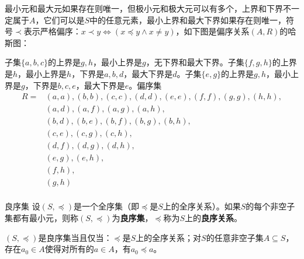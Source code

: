 \documentclass[lang=cn,11pt]{elegantbook}
\begin{document}
最小元和最大元如果存在则唯一，但极小元和极大元可以有多个，上界和下界不一定属于$A$，它们可以是$S$中的任意元素，最小上界和最大下界如果存在则唯一，符号$\prec$表示严格偏序：$x \prec y \Leftrightarrow (x \preccurlyeq y \land x \neq y)$，如下图是偏序关系$(A,R)$的哈斯图：
\begin{figure}[!ht]
\centering
{}%
\end{figure}
子集$\{a,b,c\}$的上界是$g,h$，最小上界是$g$，无下界和最大下界。子集$\{f,g,h\}$的上界是$h$，最小上界是$h$，下界是$a,b,d$，最大下界是$d$。子集$\{e,g\}$的上界是$g,h$，最小上界是$g$，下界是$b,c,e$，最大下界是$e$。偏序集
\begin{align*}
R = &(a,a), (b,b), (c,c), (d,d), (e,e), (f,f), (g,g), (h,h),\\
&(a,d), (a,f), (a,g), (a,h),\\
&(b,d), (b,e), (b,f), (b,g), (b,h),\\
&(c,e), (c,g), (c,h),\\
&(d,f), (d,g), (d,h),\\
&(e,g), (e,h),\\
&(f,h),\\
&(g,h)\\
\end{align*}
\begin{definition}{良序集}
设$(S, \preccurlyeq)$是一个全序集（即$\preccurlyeq$是$S$上的全序关系）。如果$S$的每个非空子集都有最小元，则称$(S, \preccurlyeq)$为\textbf{良序集}，$\preceq$称为$S$上的\textbf{良序关系}。
\end{definition}
$(S, \preccurlyeq)$是良序集当且仅当：$\preccurlyeq$是$S$上的全序关系；对$S$的任意非空子集$A \subseteq S$，存在$a_0 \in A$使得对所有的$a \in A$，有$a_0 \preccurlyeq a$。
\end{document}

